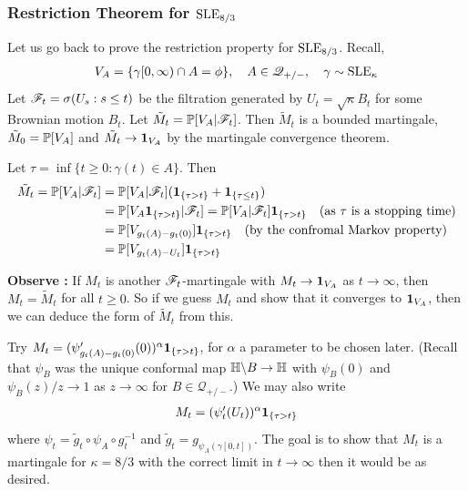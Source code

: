 \documentclass[12pt,a4paper]{article}
\begin{document}
\subsubsection*{Restriction Theorem for $\text{SLE}_{8/3}$}

Let us go back to prove the restriction property for $\text{SLE}_{8/3}$. Recall, 
\begin{align*}
V_A = \{\gamma[0, \infty) \cap A =\phi \}, \quad A\in \mathscr{Q}_{+/-}, \quad \gamma \sim \text{SLE}_{\kappa}
\end{align*}
Let $\mathscr{F}_t = \sigma(U_s : s\leq t)$ be the filtration generated by $U_t = \sqrt{\kappa}B_t$ for some Brownian motion $B_t$. Let $\tilde{M}_t = \mathbb{P}[V_A | \mathscr{F}_t]$. Then $\tilde{M}_t$ is a bounded martingale, $\tilde{M}_0 =\mathbb{P}[V_A]$ and $\tilde{M_t} \rightarrow \bm{1}_{V_A}$ by the martingale convergence theorem.

\quad Let $\tau = \inf\{t\geq 0 : \gamma(t) \in A \}$. Then
\begin{align*}
\tilde{M}_t = \mathbb{P} [V_A |\mathscr{F}_t] &= \mathbb{P}[V_A | \mathscr{F}_t] (\bm{1}_{\{\tau >t\}} + \bm{1}_{\{\tau \leq t\}}) \\
& = \mathbb{P} [V_A \bm{1}_{\{\tau >t \}} |\mathscr{F}_t] = \mathbb{P}[V_A | \mathscr{F}_t] \bm{1}_{\{\tau >t \}} \quad \text{(as } \tau \text{ is a stopping time}) \\
& =\mathbb{P} [V_{g_t(A) - g_t(0)}]\bm{1}_{\{\tau >t\}} \quad \text{(by the confromal Markov property)} \\
& =\mathbb{P} [V_{g_t(A) - U_t}]\bm{1}_{\{\tau >t\}}
\end{align*} 

\textbf{Observe :} If $M_t$ is another $\mathscr{F}_t$-martingale with $M_t \rightarrow \bm{1}_{V_A}$ as $t\rightarrow \infty$, then $M_t = \tilde{M}_t$ for all $t\geq 0$. So if we guess $M_t$ and show that it converges to $\bm{1}_{V_A}$, then we can deduce the form of $\tilde{M}_t$ from this.

\quad Try $M_t =(\psi'_{g_t(A)- g_t(0)}(0))^{\alpha}\bm{1}_{\{\tau >t\}}$, for $\alpha$ a parameter to be chosen later. (Recall that $\psi_B$ was the unique conformal map $\mathbb{H} \backslash B \rightarrow \mathbb{H}$ with $\psi_B(0)$ and $\psi_B(z) /z \rightarrow 1$ as $z\rightarrow \infty$ for $B\in \mathscr{Q}_{+/-}$.) We may also write
\begin{align*}
M_t = (\psi_t'(U_t))^{\alpha} \bm{1}_{\{\tau >t\}}
\end{align*}
where $\psi_t = \tilde{g}_t \circ \psi_A \circ g_t^{-1}$ and $\tilde{g}_t = g_{\psi_A(\gamma[0, t])}$. The goal is to show that $M_t$ is a martingale for $\kappa = 8/3$ with the correct limit in $t\rightarrow\infty$ then it would be as desired.
\s
\end{document}

